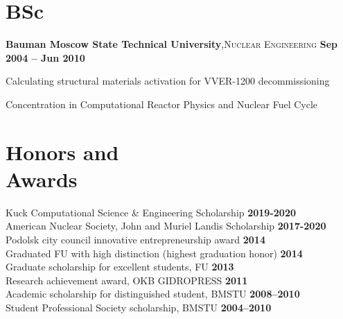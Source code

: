 \documentclass[margin,line]{resume}
\begin{document}
\begin{resume}
    \section{\mysidestyle BSc}
    \textbf{Bauman Moscow State Technical University},\textsc{Nuclear Engineering}\hfill \textbf{ Sep 2004 -- Jun 2010}\vspace{-3mm}\\\vspace{-1mm}%
    \begin{list2}
	\item Calculating structural materials activation for VVER-1200 decommissioning
	\item Concentration in Computational Reactor Physics and Nuclear Fuel Cycle
    \end{list2}\vspace{-1.5mm}

	
	\section{\mysidestyle Honors and\\Awards}
	Kuck Computational Science \& Engineering Scholarship\hfill 
	\textbf{2019-2020}\vspace{.5mm}\\%
	American Nuclear Society, John and Muriel Landis Scholarship\hfill 
	\textbf{2017-2020}\vspace{.5mm}\\%
	Podolsk city council innovative entrepreneurship award\hfill 
	\textbf{2014}\vspace{.5mm}\\%
	Graduated FU with high distinction (highest graduation 
	honor)                \hfill \textbf{2014}\vspace{.5mm}\\%
	Graduate scholarship for excellent students, 
	FU                       	\hfill \textbf{2013}\vspace{.5mm}\\%
	Research achievement award, OKB 
	GIDROPRESS                                   
	\hfill\textbf{2011}\vspace{.5mm}\\%
	Academic scholarship for distinguished student, 
	BMSTU		                 \hfill\textbf{2008--2010}\vspace{.5mm}\\%
	Student Professional Society scholarship, 
	BMSTU                                \hfill\textbf{2004--2010}%
	

\end{resume}
\end{document}
